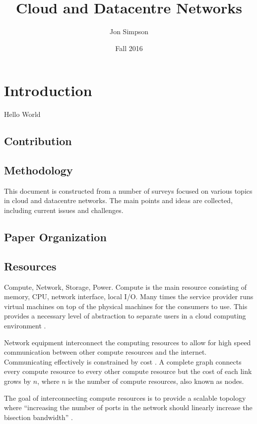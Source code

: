 \documentclass[fullapage,12pt]{article}
\title{Cloud and Datacentre Networks}
\author{Jon Simpson}
\date{Fall 2016}
\begin{document}
\begin{titlepage}
\maketitle
\end{titlepage}

\section{Introduction}
Hello World

\subsection{Contribution}

\subsection{Methodology}

This document is constructed from a number of surveys focused on various topics in cloud and datacentre networks. The main points and ideas are collected, including current issues and challenges.

\subsection{Paper Organization}

\subsection{Resources}

Compute, Network, Storage, Power. Compute is the main resource consisting of memory, CPU, network interface, local I/O. Many times the service provider runs virtual machines on top of the physical machines for the consumers to use. This provides a necessary level of abstraction to separate users in a cloud computing environment \cite{Jennings2015}.

Network equipment interconnect the computing resources to allow for high speed communication between other compute resources and the internet. Communicating effectively is constrained by cost \cite{Jennings2015}. A complete graph connects every compute resource to every other compute resource but the cost of each link grows by $n$, where $n$ is the number of compute resources, also known as nodes.

The goal of interconnecting compute resources is to provide a scalable topology where ``increasing the number of ports in the network should linearly increase the bisection bandwidth'' \cite{abts2012guided}.
\end{document}
